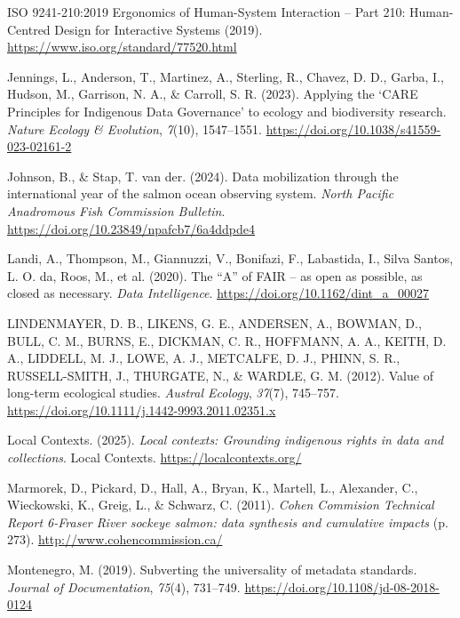 \documentclass[
  letterpaper,
  DIV=11,
  numbers=noendperiod]{scrartcl}
\newlength{\cslhangindent}
\newenvironment{CSLReferences}[2] %
 {\begin{list}{}{%
  \setlength{\itemindent}{0pt}
  \setlength{\leftmargin}{0pt}
  \setlength{\parsep}{0pt}
  \ifodd #1
   \setlength{\leftmargin}{\cslhangindent}
   \setlength{\itemindent}{-1\cslhangindent}
  \fi
  \setlength{\itemsep}{#2\baselineskip}}}
 {\end{list}}
\begin{document}
\begin{CSLReferences}{1}{0}
{ISO} 9241-210:2019 Ergonomics of Human-System Interaction -- Part 210:
Human-Centred Design for Interactive Systems (2019).
\url{https://www.iso.org/standard/77520.html}

Jennings, L., Anderson, T., Martinez, A., Sterling, R., Chavez, D. D.,
Garba, I., Hudson, M., Garrison, N. A., \& Carroll, S. R. (2023).
Applying the {`}CARE Principles for Indigenous Data Governance{'} to
ecology and biodiversity research. \emph{Nature Ecology \& Evolution},
\emph{7}(10), 1547--1551.
\url{https://doi.org/10.1038/s41559-023-02161-2}

Johnson, B., \& Stap, T. van der. (2024). Data mobilization through the
international year of the salmon ocean observing system. \emph{North
Pacific Anadromous Fish Commission Bulletin}.
\url{https://doi.org/10.23849/npafcb7/6a4ddpde4}

Landi, A., Thompson, M., Giannuzzi, V., Bonifazi, F., Labastida, I.,
Silva Santos, L. O. da, Roos, M., et al. (2020). The {{``A''}} of FAIR
-- as open as possible, as closed as necessary. \emph{Data
Intelligence}. \url{https://doi.org/10.1162/dint_a_00027}

LINDENMAYER, D. B., LIKENS, G. E., ANDERSEN, A., BOWMAN, D., BULL, C.
M., BURNS, E., DICKMAN, C. R., HOFFMANN, A. A., KEITH, D. A., LIDDELL,
M. J., LOWE, A. J., METCALFE, D. J., PHINN, S. R., RUSSELL-SMITH, J.,
THURGATE, N., \& WARDLE, G. M. (2012). Value of long{-}term ecological
studies. \emph{Austral Ecology}, \emph{37}(7), 745--757.
\url{https://doi.org/10.1111/j.1442-9993.2011.02351.x}

Local Contexts. (2025). \emph{Local contexts: Grounding indigenous
rights in data and collections}. {Local Contexts}.
\url{https://localcontexts.org/}

Marmorek, D., Pickard, D., Hall, A., Bryan, K., Martell, L., Alexander,
C., Wieckowski, K., Greig, L., \& Schwarz, C. (2011). \emph{Cohen
Commision Technical Report 6-Fraser River sockeye salmon: data synthesis
and cumulative impacts} (p. 273). \url{http://www.cohencommission.ca/}

Montenegro, M. (2019). Subverting the universality of metadata
standards. \emph{Journal of Documentation}, \emph{75}(4), 731--749.
\url{https://doi.org/10.1108/jd-08-2018-0124}


\end{CSLReferences}
\end{document}
